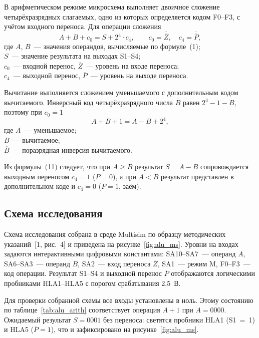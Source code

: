 \documentclass[14pt,a4paper]{extarticle}
\newcommand{\inv}[1]{\overline{#1}}
\begin{document}
В арифметическом режиме микросхема выполняет двоичное сложение четырёхразрядных слагаемых, одно из которых определяется кодом F0--F3, с учётом входного переноса. Для операции сложения
\begin{equation}
A + B + c_0 = S + 2^4 \cdot c_4, \qquad c_0 = \inv{\overline{Z}}, \quad c_4 = \inv{\overline{P}},
\end{equation}
\noindent где $A$, $B$~--- значения операндов, вычисляемые по формуле~(1);\\
$S$~--- значение результата на выходах S1--S4;\\
$c_0$~--- входной перенос, $\overline{Z}$~--- уровень на входе переноса;\\
$c_4$~--- выходной перенос, $\overline{P}$~--- уровень на выходе переноса.

Вычитание выполняется сложением уменьшаемого с дополнительным кодом вычитаемого. Инверсный код четырёхразрядного числа $\inv{B}$ равен $2^4 - 1 - B$, поэтому при $c_0 = 1$
\begin{equation}
A + \inv{B} + 1 = A - B + 2^4,
\end{equation}
\noindent где $A$~--- уменьшаемое;\\
$B$~--- вычитаемое;\\
$\inv{B}$~--- поразрядная инверсия вычитаемого.

Из формулы~(11) следует, что при $A \geq B$ результат $S = A - B$ сопровождается выходным переносом $c_4 = 1$ ($\overline{P} = 0$), а при $A < B$ результат представлен в дополнительном коде и $c_4 = 0$ ($\overline{P} = 1$, заём).

\subsection{Схема исследования}

Схема исследования собрана в среде Multisim по образцу методических указаний~[1, рис.~4] и приведена на рисунке~\ref{fig:alu_ms}. Уровни на входах задаются интерактивными цифровыми константами: SA10--SA7~--- операнд $A$, SA6--SA3~--- операнд $B$, SA2~--- вход переноса $\overline{Z}$, SA1~--- режим M, F0--F3~--- код операции. Результат S1--S4 и выходной перенос $\overline{P}$ отображаются логическими пробниками HLA1--HLA5 с порогом срабатывания 2,5~В.

Для проверки собранной схемы все входы установлены в ноль. Этому состоянию по таблице~\ref{tab:alu_arith} соответствует операция $A + 1$ при $A = 0000$. Ожидаемый результат $S = 0001$ без переноса: светятся пробники HLA1 (S1~=~1) и HLA5 ($\overline{P} = 1$), что и зафиксировано на рисунке~\ref{fig:alu_ms}.
\end{document}

